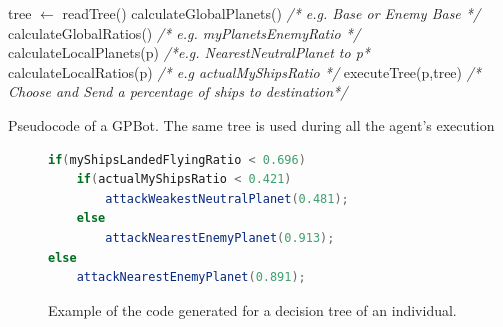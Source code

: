 \documentclass[conference]{IEEEtran}
\begin{document}
\begin{algorithm}[htb]
\begin{algorithmic}

\STATE tree $\leftarrow$ readTree()
  \STATE calculateGlobalPlanets() {\em /* e.g. Base or Enemy Base */}
  \STATE calculateGlobalRatios()  {\em /* e.g. myPlanetsEnemyRatio */}
    \STATE calculateLocalPlanets(p) {\em /*e.g. NearestNeutralPlanet to p*}
    \STATE calculateLocalRatios(p)  {\em /* e.g actualMyShipsRatio */}
    \STATE executeTree(p,tree)  {\em /* Choose and Send a percentage of ships to destination*/}
   \ENDFOR
\ENDWHILE

\end{algorithmic}
\caption{Pseudocode of a GPBot. The same tree is used during all the agent's execution}
\label{alg:turn}
\end{algorithm}

\begin{figure}

\begin{lstlisting}[frame=single,language=Java,tabsize=4]
if(myShipsLandedFlyingRatio < 0.696)
	if(actualMyShipsRatio < 0.421)
		attackWeakestNeutralPlanet(0.481);
	else
		attackNearestEnemyPlanet(0.913);
else
	attackNearestEnemyPlanet(0.891);
\end{lstlisting}

%
%

\label{fig:javatree}
\caption{Example of the code generated for a decision tree of an individual.}
\end{figure}


\end{document}
